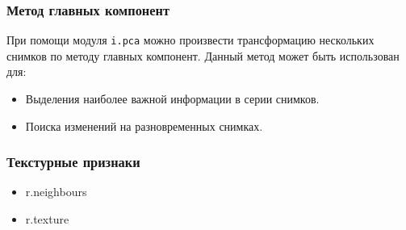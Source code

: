 \begin{frame}
    \frametitle{Метод главных компонент}
    При помощи модуля \lstinline!i.pca! можно произвести трансформацию нескольких снимков по методу главных компонент. Данный метод может быть использован для:
    \begin{itemize}
        \item Выделения наиболее важной информации в серии снимков.
        \item Поиска изменений на разновременных снимках.
    \end{itemize}
\end{frame}

\begin{frame}
    \frametitle{Текстурные признаки}
    \begin{itemize}
        \item r.neighbours
        \item r.texture
    \end{itemize}

\end{frame}







